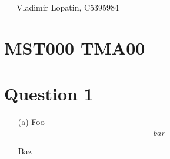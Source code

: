 \documentclass[a4paper,fleqn]{article}
\newcommand{\tab}{{\ \ \ \ }}
\begin{document}
\ \ \ Vladimir Lopatin, C5395984
\section*{MST000 TMA00}
\section*{Question 1}

\setlength{\mathindent}{15pt}
\begin{enumerate}
\item[(a)]
Foo
\begin{align*}
bar
\end{align*}


Baz
\end{enumerate}
\end{document}
